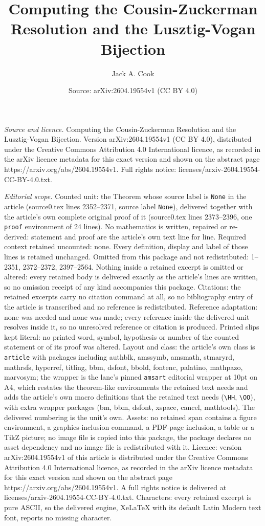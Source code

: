 \documentclass[10pt,a4paper]{amsart}
\title[Computing the Cousin-Zuckerman Resolution and the Lusztig-Vo]{Computing the Cousin-Zuckerman Resolution and the Lusztig-Vogan Bijection}
\author{Jack A. Cook}
\date{Source: arXiv:2604.19554v1 (CC BY 4.0)}
\begin{document}
\maketitle

\noindent\emph{Source and licence.} Computing the Cousin-Zuckerman Resolution and the Lusztig-Vogan Bijection. Version arXiv:2604.19554v1 (CC BY 4.0), distributed under the Creative Commons Attribution 4.0 International licence, as recorded in the arXiv licence metadata for this exact version and shown on the abstract page https://arxiv.org/abs/2604.19554v1. Full rights notice: licenses/arxiv-2604.19554-CC-BY-4.0.txt.\par\smallskip

\noindent\textit{Editorial scope.} Counted unit: the Theorem whose source label is \texttt{None} in the article (source0.tex lines 2352--2371, source label \texttt{None}), delivered together with the article's own complete original proof of it (source0.tex lines 2373--2396, one \texttt{proof} environment of 24 lines). No mathematics is written, repaired or re-derived: statement and proof are the article's own text line for line. Required context retained uncounted: none. Every definition, display and label of those lines is retained unchanged. Omitted from this package and not redistributed: 1--2351, 2372--2372, 2397--2564. Nothing inside a retained excerpt is omitted or altered: every retained body is delivered exactly as the article's lines are written, so no omission receipt of any kind accompanies this package. Citations: the retained excerpts carry no citation command at all, so no bibliography entry of the article is transcribed and no reference is redistributed. Reference adaptation: none was needed and none was made; every reference inside the delivered unit resolves inside it, so no unresolved reference or citation is produced. Printed slips kept literal: no printed word, symbol, hypothesis or number of the counted statement or of its proof was altered. Layout and class: the article's own class is \texttt{article} with packages including authblk, amssymb, amsmath, stmaryrd, mathrsfs, hyperref, titling, bbm, dsfont, bbold, fontenc, palatino, mathpazo, marvosym; the wrapper is the lane's pinned \texttt{amsart} editorial wrapper at 10pt on A4, which restates the theorem-like environments the retained text needs and adds the article's own macro definitions that the retained text needs (\texttt{\textbackslash HH}, \texttt{\textbackslash OO}), with extra wrapper packages (bm, bbm, dsfont, xspace, cancel, mathtools). The delivered numbering is the unit's own. Assets: no retained span contains a figure environment, a graphics-inclusion command, a PDF-page inclusion, a table or a TikZ picture; no image file is copied into this package, the package declares no asset dependency and no image file is redistributed with it. Licence: version arXiv:2604.19554v1 of this article is distributed under the Creative Commons Attribution 4.0 International licence, as recorded in the arXiv licence metadata for this exact version and shown on the abstract page https://arxiv.org/abs/2604.19554v1. A full rights notice is delivered at licenses/arxiv-2604.19554-CC-BY-4.0.txt. Characters: every retained excerpt is pure ASCII, so the delivered engine, XeLaTeX with its default Latin Modern text font, reports no missing character.
\end{document}
